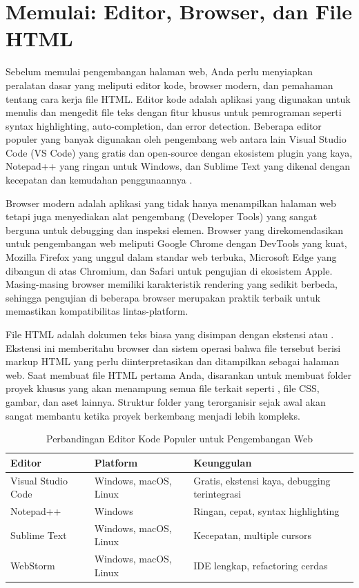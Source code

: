 ﻿\section{Memulai: Editor, Browser, dan File HTML}

Sebelum memulai pengembangan halaman web, Anda perlu menyiapkan peralatan dasar yang meliputi editor kode, browser modern, dan pemahaman tentang cara kerja file HTML. Editor kode adalah aplikasi yang digunakan untuk menulis dan mengedit file teks dengan fitur khusus untuk pemrograman seperti syntax highlighting, auto-completion, dan error detection. Beberapa editor populer yang banyak digunakan oleh pengembang web antara lain Visual Studio Code (VS Code) yang gratis dan open-source dengan ekosistem plugin yang kaya, Notepad++ yang ringan untuk Windows, dan Sublime Text yang dikenal dengan kecepatan dan kemudahan penggunaannya \cite{mdnHtmlIntro}.

Browser modern adalah aplikasi yang tidak hanya menampilkan halaman web tetapi juga menyediakan alat pengembang (Developer Tools) yang sangat berguna untuk debugging dan inspeksi elemen. Browser yang direkomendasikan untuk pengembangan web meliputi Google Chrome dengan DevTools yang kuat, Mozilla Firefox yang unggul dalam standar web terbuka, Microsoft Edge yang dibangun di atas Chromium, dan Safari untuk pengujian di ekosistem Apple. Masing-masing browser memiliki karakteristik rendering yang sedikit berbeda, sehingga pengujian di beberapa browser merupakan praktik terbaik untuk memastikan kompatibilitas lintas-platform.

File HTML adalah dokumen teks biasa yang disimpan dengan ekstensi  atau . Ekstensi ini memberitahu browser dan sistem operasi bahwa file tersebut berisi markup HTML yang perlu diinterpretasikan dan ditampilkan sebagai halaman web. Saat membuat file HTML pertama Anda, disarankan untuk membuat folder proyek khusus yang akan menampung semua file terkait seperti , file CSS, gambar, dan aset lainnya. Struktur folder yang terorganisir sejak awal akan sangat membantu ketika proyek berkembang menjadi lebih kompleks.

\begin{table}[H]
\centering
\begin{tabular}{|P{3.5cm}|P{3cm}|P{5.5cm}|}
\hline
\textbf{Editor} & \textbf{Platform} & \textbf{Keunggulan} \\
\hline
Visual Studio Code & Windows, macOS, Linux & Gratis, ekstensi kaya, debugging terintegrasi \\
\hline
Notepad++ & Windows & Ringan, cepat, syntax highlighting \\
\hline
Sublime Text & Windows, macOS, Linux & Kecepatan, multiple cursors \\
\hline
WebStorm & Windows, macOS, Linux & IDE lengkap, refactoring cerdas \\
\hline
\end{tabular}
\caption{Perbandingan Editor Kode Populer untuk Pengembangan Web}
\label{tab:editor-comparison}
\end{table}

